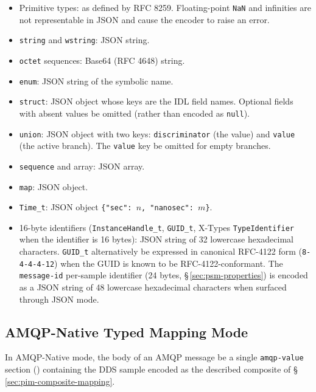 \documentclass{../styles/zerodds-vendor-spec}
\begin{document}
\begin{itemize}
  \item Primitive types: as defined by RFC 8259.
        Floating-point \texttt{NaN} and infinities are not
        representable in JSON and  cause the encoder
        to raise an error.
  \item \texttt{string} and \texttt{wstring}: JSON string.
  \item \texttt{octet} sequences: Base64 (RFC 4648) string.
  \item \texttt{enum}: JSON string of the symbolic name.
  \item \texttt{struct}: JSON object whose keys are the IDL
        field names. Optional fields with absent values
         be omitted (rather than encoded as
        \texttt{null}).
  \item \texttt{union}: JSON object with two keys:
        \texttt{discriminator} (the value) and \texttt{value}
        (the active branch). The \texttt{value} key
         be omitted for empty branches.
  \item \texttt{sequence} and array: JSON array.
  \item \texttt{map}: JSON object.
  \item \texttt{Time\_t}: JSON object \texttt{\{"sec": $n$,
        "nanosec": $m$\}}.
  \item 16-byte identifiers (\texttt{InstanceHandle\_t},
        \texttt{GUID\_t}, X-Types \texttt{TypeIdentifier} when the
        identifier is 16 bytes): JSON string of 32 lowercase
        hexadecimal characters. \texttt{GUID\_t} 
        alternatively be expressed in canonical RFC-4122 form
        (\texttt{8-4-4-4-12}) when the GUID is known to be
        RFC-4122-conformant. The \texttt{message-id} per-sample
        identifier (24 bytes, \S\,\ref{sec:psm-properties}) is
        encoded as a JSON string of 48 lowercase hexadecimal
        characters when surfaced through JSON mode.
\end{itemize}

\subsection{AMQP-Native Typed Mapping Mode}\label{sec:psm-amqp-native}

In AMQP-Native mode, the body of an AMQP message  be a
single \texttt{amqp-value} section
() containing the DDS
sample encoded as the described composite of
\S\,\ref{sec:pim-composite-mapping}.
\end{document}
